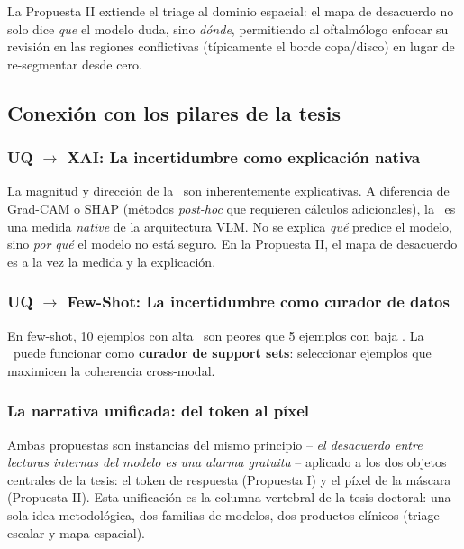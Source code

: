 \documentclass[12pt,a4paper]{article}
\newcommand{\KL}{\mathrm{KL}}
\begin{document}
La Propuesta II extiende el triage al dominio espacial: el mapa de desacuerdo no solo dice \emph{que} el modelo duda, sino \emph{dónde}, permitiendo al oftalmólogo enfocar su revisión en las regiones conflictivas (típicamente el borde copa/disco) en lugar de re-segmentar desde cero.

\subsection{Conexión con los pilares de la tesis}

\subsubsection{UQ $\rightarrow$ XAI: La incertidumbre como explicación nativa}

La magnitud y dirección de la \KL\ son inherentemente explicativas.
A diferencia de Grad-CAM o SHAP (métodos \textit{post-hoc} que requieren cálculos adicionales), la \KL\ es una medida \textit{native} de la arquitectura VLM.
No se explica \textit{qué} predice el modelo, sino \textit{por qué} el modelo no está seguro.
En la Propuesta II, el mapa de desacuerdo es a la vez la medida y la explicación.

\subsubsection{UQ $\rightarrow$ Few-Shot: La incertidumbre como curador de datos}

En few-shot, 10 ejemplos con alta \KL\ son peores que 5 ejemplos con baja \KL.
La \KL\ puede funcionar como \textbf{curador de support sets}: seleccionar ejemplos que maximicen la coherencia cross-modal.

\subsubsection{La narrativa unificada: del token al píxel}

Ambas propuestas son instancias del mismo principio -- \emph{el desacuerdo entre lecturas internas del modelo es una alarma gratuita} -- aplicado a los dos objetos centrales de la tesis: el token de respuesta (Propuesta I) y el píxel de la máscara (Propuesta II).
Esta unificación es la columna vertebral de la tesis doctoral: una sola idea metodológica, dos familias de modelos, dos productos clínicos (triage escalar y mapa espacial).

\end{document}
